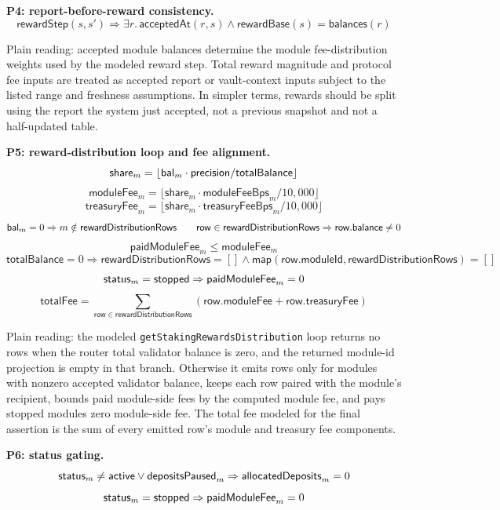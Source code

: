 \medskip
\noindent\textbf{P4: report-before-reward consistency.}
\[
  \mathsf{rewardStep}(s,s')
  \Rightarrow
  \exists r.\,
  \mathsf{acceptedAt}(r,s)
  \land
  \mathsf{rewardBase}(s)=\mathsf{balances}(r)
\]

\noindent Plain reading: accepted module balances determine the module
fee-distribution weights used by the modeled reward step. Total reward magnitude
and protocol fee inputs are treated as accepted report or vault-context inputs
subject to the listed range and freshness assumptions. In simpler terms, rewards
should be split using the report the system just accepted, not a previous
snapshot and not a half-updated table.

\medskip
\noindent\textbf{P5: reward-distribution loop and fee alignment.}
\[
  \mathsf{share}_m =
    \lfloor \mathsf{bal}_m \cdot \mathsf{precision} / \mathsf{totalBalance} \rfloor
\]
\[
  \mathsf{moduleFee}_m =
    \lfloor \mathsf{share}_m \cdot \mathsf{moduleFeeBps}_m / 10{,}000 \rfloor
\]
\[
  \mathsf{treasuryFee}_m =
    \lfloor \mathsf{share}_m \cdot \mathsf{treasuryFeeBps}_m / 10{,}000 \rfloor
\]
\[
  \mathsf{bal}_m = 0 \Rightarrow m \notin \mathsf{rewardDistributionRows}
  \qquad
  \mathsf{row}\in\mathsf{rewardDistributionRows}\Rightarrow \mathsf{row.balance}\ne0
\]
\[
  \mathsf{paidModuleFee}_m \leq \mathsf{moduleFee}_m
\]
\[
  \mathsf{totalBalance}=0
  \Rightarrow
  \mathsf{rewardDistributionRows}=[]
  \land
  \mathsf{map}(\mathsf{row.moduleId},\mathsf{rewardDistributionRows})=[]
\]
\[
  \mathsf{status}_m = \mathsf{stopped}
  \Rightarrow
  \mathsf{paidModuleFee}_m = 0
\]
\[
  \mathsf{totalFee} =
    \sum_{\mathsf{row}\in\mathsf{rewardDistributionRows}}
      (\mathsf{row.moduleFee}+\mathsf{row.treasuryFee})
\]

\noindent Plain reading: the modeled
\texttt{getStakingRewardsDistribution} loop returns no rows when the router
total validator balance is zero, and the returned module-id projection is empty
in that branch. Otherwise it emits rows only for modules with nonzero accepted
validator balance, keeps each row paired with the module's recipient, bounds
paid module-side fees by the computed module fee, and pays stopped modules zero
module-side fee. The total fee modeled for the final assertion is the sum of
every emitted row's module and treasury fee components.

\medskip
\noindent\textbf{P6: status gating.}
\[
  \mathsf{status}_m \neq \mathsf{active} \lor \mathsf{depositsPaused}_m
  \Rightarrow
  \mathsf{allocatedDeposits}_m = 0
\]
\[
  \mathsf{status}_m = \mathsf{stopped}
  \Rightarrow
  \mathsf{paidModuleFee}_m = 0
\]

